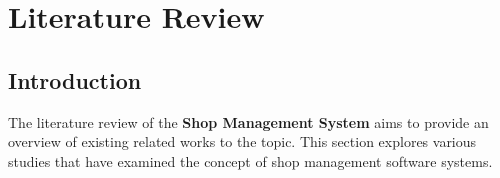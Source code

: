 \chapter{Literature Review}
\section{Introduction}
The literature review of the \textbf{Shop Management System} aims to provide an overview of existing related works to the topic. This section explores various studies that have examined the concept of shop management software systems.



% 
